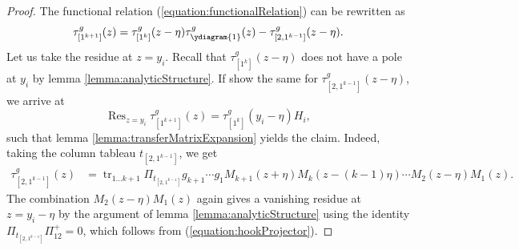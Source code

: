 \documentclass[11pt]{report}
\theoremstyle{definition}
\theoremstyle{remark}
\theoremstyle{remark}
\begin{document}
\begin{proof}
The functional relation (\ref{equation:functionalRelation}) can be rewritten as
\begin{equation*}
\tau_{[1^{k+1}]}^g(z) = \tau_{[1^k]}^g(z-\eta) \tau_{\ydiagram{1}}^g(z) - \tau_{[2,1^{k-1}]}^g(z-\eta).
\end{equation*}
Let us take the residue at $z=y_i$. Recall that $\tau_{[1^k]}^g(z-\eta)$ does not have a pole at $y_i$ by lemma \ref{lemma:analyticStructure}. If show the same for $\tau_{[2,1^{k-1}]}^g(z-\eta)$, we arrive at
\begin{equation*}
\operatorname{Res}_{z=y_i} \tau_{[1^{k+1}]}^g(z)
= \tau_{[1^k]}^g(y_i-\eta) H_i,
\end{equation*}
such that lemma \ref{lemma:transferMatrixExpansion} yields the claim.
Indeed, taking the column tableau $t_{[2,1^{k-1}]}$, we get
\begin{align*}
\tau_{[2,1^{k-1}]}^g(z)
&= \operatorname{tr}_{1...k+1} \Pi_{t_{[2,1^{k-1}]}} g_{k+1} \cdots g_1 M_{k+1}(z+\eta) M_k(z-(k-1)\eta) \cdots M_2(z-\eta) M_1(z).
\end{align*}
The combination $M_2(z-\eta) M_1(z)$ again gives a vanishing residue at $z=y_i-\eta$ by the argument of lemma \ref{lemma:analyticStructure} using the identity $\Pi_{t_{[2,1^{k-1}]}} \Pi_{12}^+ = 0$, which follows from (\ref{equation:hookProjector}).
\end{proof}
\end{document}
